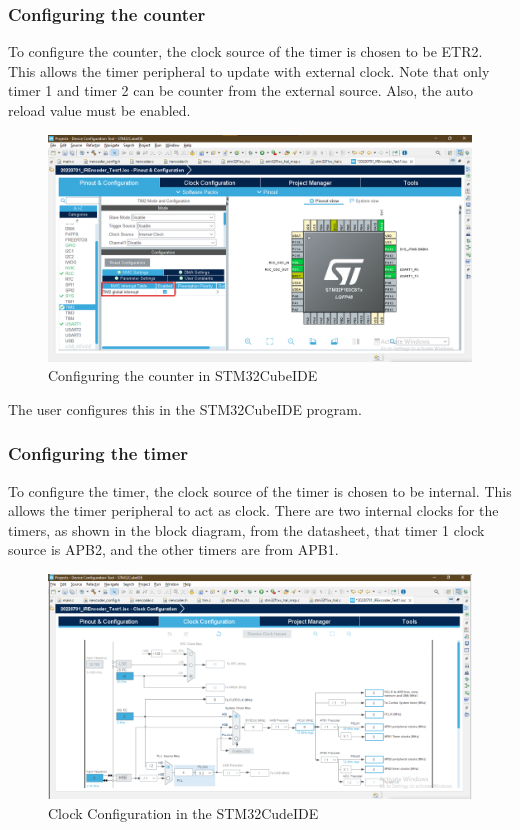 \subsubsection{Configuring the counter}
To configure the counter, the clock source of the timer is chosen to be ETR2. This allows the timer peripheral to update with external clock.
Note that only timer 1 and timer 2 can be counter from the external source.
Also, the auto reload value must be enabled.
\begin{figure}[h]
    \centering
    \includegraphics[scale=.4]{figuresEncoder/6.png}
    \caption{Configuring the counter in STM32CubeIDE}
\end{figure}
The user configures this in the STM32CubeIDE program.
\clearpage
\subsubsection{Configuring the timer}
To configure the timer, the clock source of the timer is chosen to be internal. This allows the timer peripheral to act as clock.
There are two internal clocks for the timers, as shown in the block diagram, from the datasheet, that timer 1 clock source is APB2, and the other timers are from APB1.

\begin{figure}[h]
    \centering
    \includegraphics[scale=.8]{figuresEncoder/7.png}
    \caption{Clock Configuration in the STM32CudeIDE}
\end{figure}

